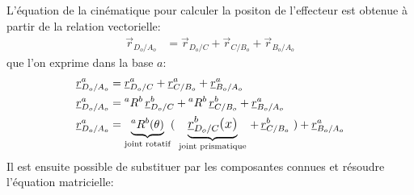 L'équation de la cinématique pour calculer la positon de l'effecteur est obtenue à partir de la relation vectorielle:
\begin{align}
\vec{r}_{D_o/A_o}   &=  \vec{r}_{D_o/C} + \vec{r}_{C/B_o} + \vec{r}_{B_o/A_o}
\end{align} 
que l'on exprime dans la base $a$:
\begin{align}
\underline{r}_{D_o/A_o}^a &=  \underline{r}_{D_o/C}^a + \underline{r}_{C/B_o}^a + \underline{r}_{B_o/A_o}^a \\
\underline{r}_{D_o/A_o}^a &=  {}^aR^b  \, \underline{r}_{D_o/C}^b + {}^aR^b \, \underline{r}_{C/B_o}^b + \underline{r}_{B_o/A_o}^a \\
\underline{r}_{D_o/A_o}^a &=   \underbrace{{}^aR^b(\theta)}_{\text{joint rotatif}} \large( \, \, \underbrace{\underline{r}_{D_o/C}^b(x)}_{\text{joint prismatique}} \, + \, \underline{r}_{C/B_o}^b  \, \, \large) + \underline{r}_{B_o/A_o}^a 
\end{align} 
Il est ensuite possible de substituer par les composantes connues et résoudre l'équation matricielle:
